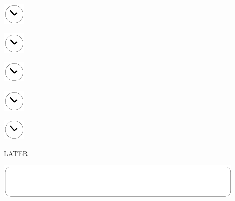 \documentclass[11pt,titlepage]{article}
\begin{document}
\vspace{10,5mm}

\noindent
\hspace{1mm}\includegraphics[]{clockface.pdf}

\vspace{10,5mm}

\noindent
\hspace{1mm}\includegraphics[]{clockface.pdf}

\vspace{10,5mm}

\noindent
\hspace{1mm}\includegraphics[]{clockface.pdf}

\vspace{10,5mm}

\noindent
\hspace{1mm}\includegraphics[]{clockface.pdf}

\vspace{10,5mm}

\noindent
\hspace{1mm}\includegraphics[]{clockface.pdf}

\pagebreak

\small
\hfill LATER

\vspace{6mm}

\noindent
\includegraphics[]{mediumbox.pdf}

\vspace{15mm}
\end{document}

